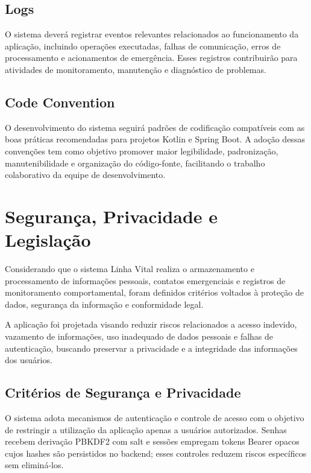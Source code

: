 \subsection{Logs}

O sistema deverá registrar eventos relevantes relacionados ao funcionamento da aplicação, incluindo operações executadas, falhas de comunicação, erros de processamento e acionamentos de emergência. Esses registros contribuirão para atividades de monitoramento, manutenção e diagnóstico de problemas.

\subsection{Code Convention}

O desenvolvimento do sistema seguirá padrões de codificação compatíveis com as boas práticas recomendadas para projetos Kotlin e Spring Boot. A adoção dessas convenções tem como objetivo promover maior legibilidade, padronização, manutenibilidade e organização do código-fonte, facilitando o trabalho colaborativo da equipe de desenvolvimento.

\section{Segurança, Privacidade e Legislação}

Considerando que o sistema Linha Vital realiza o armazenamento e processamento de informações pessoais, contatos emergenciais e registros de monitoramento comportamental, foram definidos critérios voltados à proteção de dados, segurança da informação e conformidade legal.

A aplicação foi projetada visando reduzir riscos relacionados a acesso indevido, vazamento de informações, uso inadequado de dados pessoais e falhas de autenticação, buscando preservar a privacidade e a integridade das informações dos usuários.

\subsection{Critérios de Segurança e Privacidade}

O sistema adota mecanismos de autenticação e controle de acesso com o objetivo de restringir a utilização da aplicação apenas a usuários autorizados. Senhas recebem derivação PBKDF2 com salt e sessões empregam tokens Bearer opacos cujos hashes são persistidos no backend; esses controles reduzem riscos específicos sem eliminá-los.

